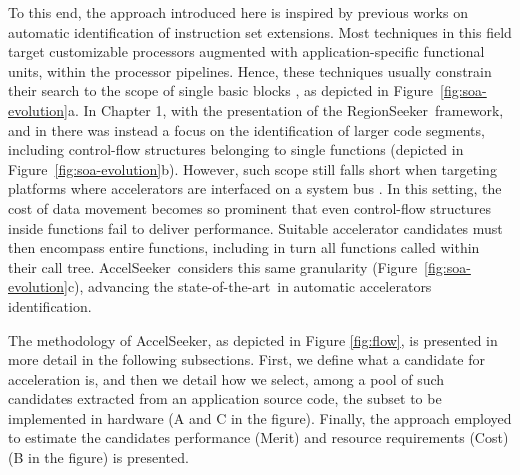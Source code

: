 \documentclass[]{usiinfthesis}
\newcommand{\aseeker}{{AccelSeeker}}
\newcommand{\rseeker}{{RegionSeeker}}
\newcommand{\SoTA}{{state-of-the-art}}
\begin{document}
To this end, the approach introduced here is inspired by previous works 
on automatic
identification of instruction set extensions. Most techniques in this
field target customizable processors augmented with
application-specific functional units, within the processor pipelines.
Hence, these techniques usually constrain their search to the scope of
single basic blocks \cite{PozziJul06} \cite{GiaquintaMar15}, as
depicted in Figure~\ref{fig:soa-evolution}a. In Chapter 1, with the 
presentation of the \rseeker\ framework, and in \cite{OppermannJul16} 
there was instead a focus on the identification of larger code segments, including
control-flow structures belonging to single functions (depicted in
Figure~\ref{fig:soa-evolution}b).  However, such scope still falls
short when targeting platforms where
accelerators are interfaced on a system bus
\cite{CotaJun15}. In this setting, the cost of data movement becomes
so prominent that even control-flow structures inside functions fail
to deliver performance. Suitable accelerator candidates must then
encompass entire functions, including in turn all functions called
within their call tree. \aseeker\ considers this same granularity
(Figure~\ref{fig:soa-evolution}c), advancing the \SoTA\ in
automatic accelerators identification.


The methodology of \aseeker, as depicted in Figure \ref{fig:flow}, 
is presented in 
more detail in the following subsections. 
First, we define what a candidate for acceleration is, and then we detail how we select, 
among a pool of such candidates extracted from an application source code, the subset to 
be implemented in hardware (A and C in the figure).
Finally, the approach employed to estimate 
the candidates performance (Merit) and resource requirements (Cost) (B in the figure) is presented.
\end{document}
